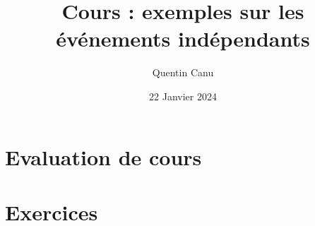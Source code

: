 \documentclass{article}
\title{Cours : exemples sur les événements indépendants}
\date{22 Janvier 2024}
\author{Quentin Canu}
\begin{document}
\maketitle
\section{Evaluation de cours}
\section{Exercices}
\end{document}
